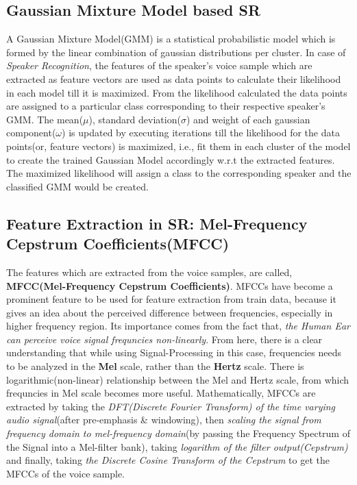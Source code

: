 \documentclass{article}
\begin{document}
\subsection{Gaussian Mixture Model based SR}
A Gaussian Mixture Model(GMM) is a statistical probabilistic model which is formed by the linear combination of gaussian distributions per cluster. In case of \textit{Speaker Recognition}, the features of the speaker's voice sample which are extracted as feature vectors are used as data points to calculate their likelihood in each model till it is maximized. From the likelihood calculated the data points are assigned to a particular class corresponding to their respective speaker's GMM. The mean($\mu$), standard deviation($\sigma$) and weight of each gaussian component($\omega$) is updated by executing iterations till the likelihood for the data points(or, feature vectors) is maximized, i.e., fit them in each cluster of the model to create the trained Gaussian Model accordingly w.r.t the extracted features. The maximized likelihood will assign a class to the corresponding speaker and the classified GMM would be created. 

\subsection{Feature Extraction in SR: Mel-Frequency Cepstrum Coefficients(MFCC)}
The features which are extracted from the voice samples, are called, \textbf{MFCC(Mel-Frequency Cepstrum Coefficients)}. MFCCs have become a prominent feature to be used for feature extraction from train data, because it gives an idea about the perceived difference between frequencies, especially in higher frequency region. Its importance comes from the fact that, \textit{the Human Ear can perceive voice signal frequncies non-linearly}. From here, there is a clear understanding that while using Signal-Processing in this case, frequencies needs to be analyzed in the \textbf{Mel} scale, rather than the \textbf{Hertz} scale. There is logarithmic(non-linear) relationship between the Mel and Hertz scale, from which frequncies in Mel scale becomes more useful. Mathematically, MFCCs are extracted by taking the \textit{DFT(Discrete Fourier Transform) of the time varying audio signal}(after pre-emphasis \& windowing), then \textit{scaling the signal from frequency domain to mel-frequency domain}(by passing the Frequency Spectrum of the Signal into a Mel-filter bank), taking \textit{logarithm of the filter output(Cepstrum)} and finally, taking \textit{the Discrete Cosine Transform of the Cepstrum} to get the MFCCs of the voice sample.
\end{document}
